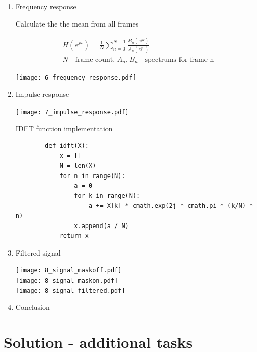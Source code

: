 \documentclass[a4paper, 11pt]{article}
\begin{document}
\begin{enumerate}
        \item
        Frequency response

        Calculate the the mean from all frames

        \begin{gather*}
            H(e^{j\omega}) = \frac{1}{N} \sum_{n=0}^{N-1} \frac{ B_n(e^{j\omega}) }{ A_n(e^{j\omega}) } \\
            N \text{ - frame count, } A_n, B_n \text{ - spectrums for frame n}
        \end{gather*}

        \texttt{[image: 6\_frequency\_response.pdf]}

        \item
        Impulse response

        \texttt{[image: 7\_impulse\_response.pdf]}

        IDFT function implementation

        \begin{verbatim}
        def idft(X):
            x = []
            N = len(X)
            for n in range(N):
                a = 0
                for k in range(N):
                    a += X[k] * cmath.exp(2j * cmath.pi * (k/N) * n)
                x.append(a / N)
            return x
        \end{verbatim}

        \newpage

        \item
        Filtered signal

        \texttt{[image: 8\_signal\_maskoff.pdf]} \\
        \texttt{[image: 8\_signal\_maskon.pdf]} \\
        \texttt{[image: 8\_signal\_filtered.pdf]}

        \item
        Conclusion

    \end{enumerate}

    \newpage
    \section*{Solution - additional tasks}
\end{document}
